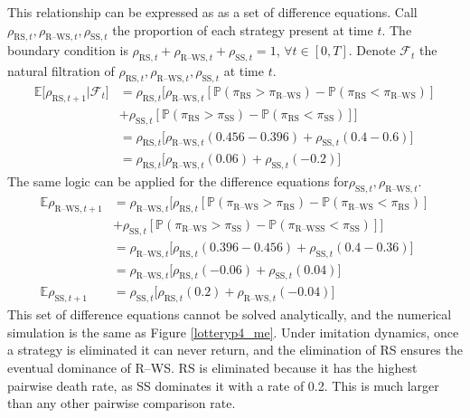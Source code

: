 This relationship can be expressed as as a set of difference equations. Call $\rho_{\text{RS},t}, \rho_{\text{R--WS},t}, \rho_{\text{SS},t}$ the proportion of each strategy present at time $t$. The boundary condition is $\rho_{\text{RS},t}+ \rho_{\text{R--WS},t}+ \rho_{\text{SS},t} = 1$, $\forall t \in [0,T]$. Denote $\mathcal F_t$ the natural filtration of $\rho_{\text{RS},t}, \rho_{\text{R--WS},t}, \rho_{\text{SS},t}$ at time $t$.  \\
\begin{align*}
    \mathbb E \big [\rho_{\text{RS},t+1}| \mathcal F_t \big ] &= \rho_{\text{RS},t} \Bigg [ \rho_{\text{R--WS},t} [\mathbb P (\pi_\text{RS} > \pi_{\text{R--WS}}) -\mathbb P (\pi_\text{RS} < \pi_{\text{R--WS}}) ] \\
    &+ \rho_{\text{SS},t} [\mathbb P (\pi_\text{RS} > \pi_{\text{SS}}) -\mathbb P (\pi_\text{RS} < \pi_{\text{SS}}) ] \Bigg ] \\
    &= \rho_{\text{RS},t}\Bigg [ \rho_{\text{R--WS},t}(0.456 - 0.396) + \rho_{\text{SS},t}(0.4 - 0.6)  \Bigg ] \\
    &= \rho_{\text{RS},t}\Bigg [ \rho_{\text{R--WS},t}(0.06) + \rho_{\text{SS},t}(-0.2)  \Bigg ]
\end{align*}
The same logic can be applied for the difference equations for$\rho_{\text{SS},t}, \rho_{\text{R--WS},t}$. \\
\begin{align*}
    \mathbb E \rho_{\text{R--WS},t+1} &= \rho_{\text{R--WS},t} \Bigg [ \rho_{\text{RS},t} [\mathbb P (\pi_\text{R--WS} > \pi_{\text{RS}}) -\mathbb P (\pi_\text{R--WS} < \pi_{\text{RS}}) ] \\
    &+  \rho_{\text{SS},t} [\mathbb P (\pi_\text{R--WS} > \pi_{\text{SS}}) -\mathbb P (\pi_\text{R--WSS} < \pi_{\text{SS}}) ] \Bigg ] \\
    &= \rho_{\text{R--WS},t}\Bigg [ \rho_{\text{RS},t}(0.396-0.456) + \rho_{\text{SS},t}(0.4 - 0.36)  \Bigg ] \\
    &= \rho_{\text{R--WS},t}\Bigg [ \rho_{\text{RS},t}(-0.06) + \rho_{\text{SS},t}(0.04)  \Bigg ] \\
    \mathbb E \rho_{\text{SS},t+1}&= \rho_{\text{SS},t}\Bigg [ \rho_{\text{RS},t}(0.2) + \rho_{\text{R--WS},t}(-0.04)  \Bigg ]
\end{align*}
This set of difference equations cannot be solved analytically, and the numerical simulation is the same as Figure \ref{lotteryp4_me}. Under imitation dynamics, once a strategy is eliminated it can never return, and the elimination of RS ensures the eventual dominance of R--WS. RS is eliminated because it has the highest pairwise death rate, as SS dominates it with a rate of 0.2. This is much larger than any other pairwise comparison rate.  \\

